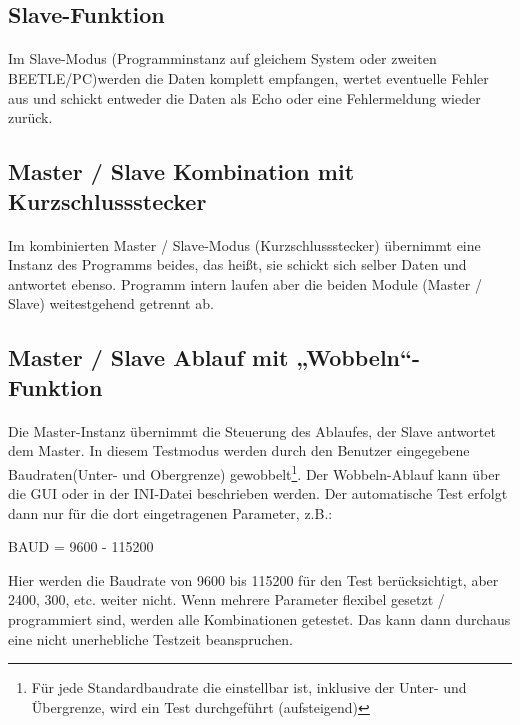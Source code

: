 \subsection{Slave-Funktion}
\paragraph{}
Im Slave-Modus (Programminstanz auf gleichem System oder zweiten BEETLE/PC)werden die Daten komplett empfangen, wertet eventuelle Fehler aus und schickt entweder die Daten als Echo oder eine Fehlermeldung wieder zurück. 

\subsection{Master / Slave Kombination mit Kurzschlussstecker}
\paragraph{}
Im kombinierten Master / Slave-Modus (Kurzschlussstecker) übernimmt eine Instanz des Programms beides, das heißt, sie schickt sich selber Daten und antwortet ebenso. Programm intern laufen aber die beiden Module (Master / Slave) weitestgehend getrennt ab.

\subsection{Master / Slave Ablauf mit „Wobbeln“-Funktion}
\paragraph{}
Die Master-Instanz übernimmt die Steuerung des Ablaufes, der Slave antwortet dem Master. In diesem Testmodus werden durch den Benutzer eingegebene Baudraten(Unter- und Obergrenze) gewobbelt\footnote{Für jede Standardbaudrate die einstellbar ist, inklusive der Unter- und Übergrenze, wird ein Test durchgeführt (aufsteigend)}. Der Wobbeln-Ablauf kann über die GUI oder in der INI-Datei beschrieben werden. Der automatische Test erfolgt dann nur für die dort eingetragenen Parameter, z.B.:

\begin{center}
BAUD = 9600 - 115200
\end{center}


Hier werden die Baudrate von 9600 bis 115200 für den Test berücksichtigt, aber 2400, 300, etc. weiter nicht. Wenn mehrere Parameter flexibel gesetzt / programmiert sind, werden alle Kombinationen getestet. Das kann dann durchaus eine nicht unerhebliche Testzeit beanspruchen.\\

